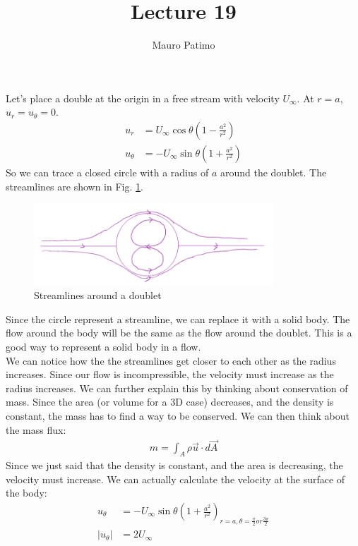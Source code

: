 \documentclass{article}
\title{Lecture 19}
\author{Mauro Patimo}
\begin{document}
\maketitle
Let's place a double at the origin in a free stream with velocity $U_\infty$. At $r=a$, $u_r=u_{\theta}=0$.\\
\begin{align*}
    u_r&=U_\infty\cos\theta\left(1-\frac{a^2}{r^2}\right)\\
    u_\theta&=-U_\infty\sin\theta\left(1+\frac{a^2}{r^2}\right)
\end{align*}
So we can trace a closed circle with a radius of $a$ around the doublet. The streamlines are shown in Fig. \ref{fig:Streamlines around a doublet.png}. \\
\begin{figure}
    \centering
    \includegraphics[width=0.8\textwidth]{Streamlines around a doublet.png}
    \caption{Streamlines around a doublet}
    \label{fig:Streamlines around a doublet.png}
\end{figure}
Since the circle represent a streamline, we can replace it with a solid body. The flow around the body will be the same as the flow around the doublet. This is a good way to represent a solid body in a flow.\\
We can notice how the the streamlines get closer to each other as the radius increases. Since our flow is incompressible, the velocity must increase as the radius increases. 
We can further explain this by thinking about conservation of mass. Since the area (or volume for a 3D case) decreases, and the density is constant, the mass has to find a way to be conserved. We can then think about the mass flux:
\begin{align*}
    m = \int_A \rho \vec{u}\cdot d\vec{A}
\end{align*}
Since we just said that the density is constant, and the area is decreasing, the velocity must increase. We can actually calculate the velocity at the surface of the body:
\begin{align*}
    u_\theta&=-U_\infty\sin\theta\left(1+\frac{a^2}{r^2}\right)_{r=a, \theta=\frac{\pi}{2} or \frac{3\pi}{2}}\\
    |u_\theta|&=2U_\infty
\end{align*}
\end{document}
